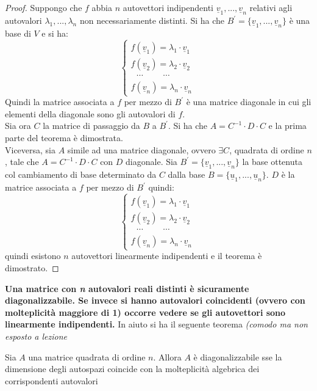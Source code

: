 \documentclass[a4paper,12pt, oneside]{book}
\begin{document}
\begin{proof}
	Suppongo che $f$ abbia $n$ autovettori indipendenti $\underline{v}_1,...,\underline{v}_n$ relativi agli autovalori $\lambda_1,...,\lambda_n$ non necessariamente distinti. Si ha che $B^{'}=\{\underline{v}_1,...,\underline{v}_n\}$ è una base di $V$ e si ha:
	$$\begin{cases}
			f(\underline{v}_1)=\lambda_1\cdot \underline{v}_1 \\
			f(\underline{v}_2)=\lambda_2\cdot \underline{v}_2 \\
			\,\,\,\,\cdots\,\,\,\,\,\,\,\,\,\,\,\,\,\,\cdots  \\
			f(\underline{v}_n)=\lambda_n\cdot \underline{v}_n\
		\end{cases}$$
	Quindi la matrice associata a $f$ per mezzo di $B^{'}$ è una matrice diagonale in cui gli elementi della diagonale sono gli autovalori di $f$.\\
	Sia ora $C$ la matrice di passaggio da $B$ a $B^{'}$. Si ha che $A=C^{-1}\cdot D\cdot C$ e la prima parte del teorema è dimostrata.\\
	Viceversa, sia $A$ simile ad una matrice diagonale, ovvero $\exists C$, quadrata di ordine $n$, tale che $A=C^{-1}\cdot D\cdot C$ con $D$ diagonale. Sia $B^{'}=\{\underline{v}_1,...,\underline{v}_n\}$ la base ottenuta col cambiamento di base determinato da $C$ dalla base $B=\{\underline{u}_1,...,\underline{u}_n\}$. $D$ è la matrice associata a $f$ per mezzo di $B^{'}$ quindi:
	$$\begin{cases}
			f(\underline{v}_1)=\lambda_1\cdot \underline{v}_1 \\
			f(\underline{v}_2)=\lambda_2\cdot \underline{v}_2 \\
			\,\,\,\,\cdots\,\,\,\,\,\,\,\,\,\,\,\,\,\,\cdots  \\
			f(\underline{v}_n)=\lambda_n\cdot \underline{v}_n\
		\end{cases}$$
	quindi esistono $n$ autovettori linearmente indipendenti e il teorema è dimostrato.
\end{proof}
\textbf{Una matrice con \textit{n} autovalori reali distinti è sicuramente diagonalizzabile. Se invece si hanno autovalori coincidenti (ovvero con molteplicità maggiore di 1) occorre vedere se gli autovettori sono linearmente indipendenti. }
In aiuto si ha il seguente teorema \textit{(comodo ma non esposto a lezione}
\begin{teorema}[bonus]
	Sia $A$ una matrice quadrata di ordine $n$. Allora $A$ è diagonalizzabile sse la dimensione degli autospazi coincide con la molteplicità algebrica dei corrispondenti autovalori
\end{teorema}
\end{document}
